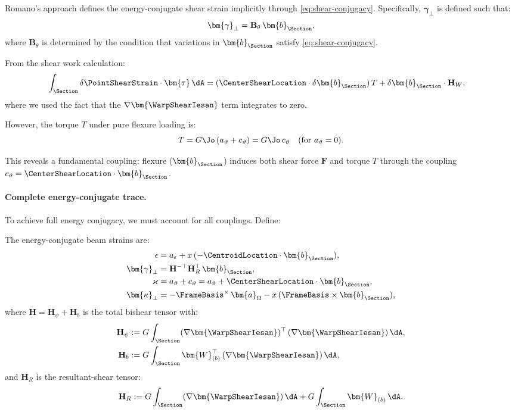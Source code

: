 Romano's approach defines the energy-conjugate shear strain implicitly through 
\eqref{eq:shear-conjugacy}. Specifically, $\bm{\gamma}_\perp$ is defined such that:
\begin{equation}
\bm{\gamma}_\perp = \mathbf{B}_\theta\,\bm{b}_{\Section},
\label{eq:romano-shear}
\end{equation}
where $\mathbf{B}_\theta$ is determined by the condition that variations in 
$\bm{b}_{\Section}$ satisfy \eqref{eq:shear-conjugacy}.

From the shear work calculation:
\begin{align*}
\int_\Section \delta\PointShearStrain \cdot \bm{\tau} \, \dA 
&= (\CenterShearLocation \cdot \delta\bm{b}_{\Section})\,T 
+ \delta\bm{b}_{\Section} \cdot \mathbf{H}_W,
\end{align*}
where we used the fact that the $\nabla\bm{\WarpShearIesan}$ term integrates to zero.

However, the torque $T$ under pure flexure loading is:
\begin{equation}
T = G\Jo\,(a_\vartheta + c_\vartheta) = G\Jo\,c_\vartheta \quad \text{(for } a_\vartheta = 0\text{)}.
\end{equation}

This reveals a fundamental coupling: flexure ($\bm{b}_{\Section}$) induces both shear 
force $\bm{F}$ and torque $T$ through the coupling $c_\vartheta = \CenterShearLocation \cdot \bm{b}_{\Section}$.

\paragraph{Complete energy-conjugate trace.}

To achieve full energy conjugacy, we must account for all couplings. 
Define:

The energy-conjugate beam strains are:
\begin{align}
\epsilon &= a_\varepsilon + x\,(-\CentroidLocation \cdot \bm{b}_{\Section}), 
\label{eq:ec-axial} \\
\bm{\gamma}_\perp &= \mathbf{H}^{-\top}\mathbf{H}_R^\top\,\bm{b}_{\Section}, 
\label{eq:ec-shear} \\
\varkappa &= a_\vartheta + c_\vartheta = a_\vartheta + \CenterShearLocation \cdot \bm{b}_{\Section}, 
\label{eq:ec-twist} \\
\bm{\kappa}_\perp &= -\FrameBasis^\times\,\bm{a}_\Omega - x\,(\FrameBasis \times \bm{b}_{\Section}),
\label{eq:ec-curv}
\end{align}
where $\mathbf{H} = \mathbf{H}_\psi + \mathbf{H}_b$ is the total bishear tensor with:
\begin{align}
\mathbf{H}_\psi &:= G \int_\Section (\nabla\bm{\WarpShearIesan})^\top\,(\nabla\bm{\WarpShearIesan}) \, \dA, 
\label{eq:def-H-psi} \\
\mathbf{H}_b &:= G \int_\Section \bm{W}_{(b)}^\top\,(\nabla\bm{\WarpShearIesan}) \, \dA,
\label{eq:def-H-b}
\end{align}
and $\mathbf{H}_R$ is the resultant-shear tensor:
\begin{equation}
\mathbf{H}_R := G \int_\Section (\nabla\bm{\WarpShearIesan}) \, \dA 
+ G \int_\Section \bm{W}_{(b)} \, \dA.
\label{eq:def-H-R}
\end{equation}

